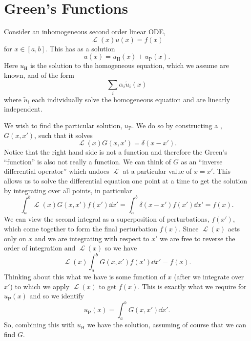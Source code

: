 \documentclass[fleqn]{NotesClass}
\DeclareMathOperator{\linop}{\mathcal{L}}
\begin{document}
    \section{Green's Functions}
    Consider an inhomogeneous second order linear ODE,
    \begin{equation}
        \linop(x) u(x) = f(x)
    \end{equation}
    for \(x \in [a, b]\).
    This has as a solution
    \begin{equation}
        u(x) = u_{\mathrm{H}}(x) + u_{\mathrm{P}}(x).
    \end{equation}
    Here \(u_{\mathrm{H}}\) is the solution to the homogeneous equation, which we assume are known, and of the form
    \begin{equation}
        \sum_{i} \alpha_i \tilde{u}_i(x)
    \end{equation}
    where \(\tilde{u}_i\) each individually solve the homogeneous equation and are linearly independent.
    
    We wish to find the particular solution, \(u_{\mathrm{P}}\).
    We do so by constructing a , \(G(x, x')\), such that it solves
    \begin{equation}
        \linop(x) G(x, x') = \delta(x - x').
    \end{equation}
    Notice that the right hand side is not a function and therefore the Green's \enquote{function} is also not really a function.
    We can think of \(G\) as an \enquote{inverse differential operator} which undoes \(\linop\) at a particular value of \(x = x'\).
    This allows us to solve the differential equation one point at a time to get the solution by integrating over all points, in particular
    \begin{equation}
        \int_{a}^{b} \linop(x) G(x,x') f(x') \dd{x'} = \int_{a}^{b} \delta(x - x') f(x') \dd{x'} = f(x).
    \end{equation}
    We can view the second integral as a superposition of perturbations, \(f(x')\), which come together to form the final perturbation \(f(x)\).
    Since \(\linop(x)\) acts only on \(x\) and we are integrating with respect to \(x'\) we are free to reverse the order of integration and \(\linop(x)\) so we have
    \begin{equation}
        \linop(x) \int_{a}^{b} G(x, x') f(x') \dd{x'} = f(x).
    \end{equation}
    Thinking about this what we have is some function of \(x\) (after we integrate over \(x'\)) to which we apply \(\linop(x)\) to get \(f(x)\).
    This is exactly what we require for \(u_{\mathrm{P}}(x)\) and so we identify
    \begin{equation}
        u_{\mathrm{P}}(x) = \int_{a}^{b} G(x, x') \dd{x'}.
    \end{equation}
    So, combining this with \(u_{\mathrm{H}}\) we have the solution, assuming of course that we can find \(G\).
    
\end{document}
